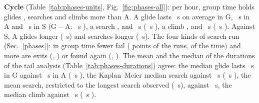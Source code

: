 \documentclass[10pt,a4paper]{article}
\newcommand{\G}{\mathrm{G}}
\newcommand{\A}{\mathrm{A}}
\newcommand{\Sl}{\mathrm{S}}
\newenvironment{step}{\begin{description}[leftmargin=0pt, itemsep=7pt, topsep=8pt]}{\end{description}}
\begin{document}
\begin{step}
  \textbf{Cycle} (Table~\ref{tab:phases-units}, Fig.~\ref{fig:phases-all}): per hour, group time holds
  \PhGlidePerHourGAAll{} glides \PhGlidePerHourGAAllBand, \PhSearchPerHourGAAll{} searches
  \PhSearchPerHourGAAllBand{} and \PhCphGAAll{} climbs more than $\A$. A glide lasts \PhGlideMeanGAll~s on average in $\G$,
  \PhGlideMeanAAll~s in $\A$ and \PhGlideMeanSAll~s in $\Sl$ ($\G-\A$: \PhGlideMeanGAAll~s \PhGlideMeanGAAllBand), a search
  \PhSearchMeanGAll, \PhSearchMeanAAll{} and \PhSearchMeanSAll~s (\PhSearchMeanGAAll~s \PhSearchMeanGAAllBand), a climb
  \PhClimbMeanGAll, \PhClimbMeanAAll{} and \PhClimbMeanSAll~s (\PhClimbMeanGAAll~s \PhClimbMeanGAAllBand). Against $\Sl$,
  $\A$ glides longer (\PhGlideMeanASAll~s) and searches longer (\PhSearchMeanASAll~s). The four kinds of search run
  (Sec.~\ref{phases}): in group time fewer fail (\PhKindFailedRunsGAAll{} points of the runs, \PhKindFailedTimeGAAll{} of the
  time) and more are exits (\PhKindExitRunsGAAll{}, \PhKindExitTimeGAAll) or found again (\PhKindRefoundRunsGAAll{},
  \PhKindRefoundTimeGAAll).
  The mean and the median of the durations of the tail analysis (Table~\ref{tab:phases-durations}) agree: the median
  glide lasts \PhDurMedianGlideGAll~s in $\G$ against \PhDurMedianGlideAAll~s in $\A$ (\PhDurMedianGlideGAAll~s
  \PhDurMedianGlideGAAllBand), the Kaplan--Meier median search \PhDurMedianSearchGAll{} against
  \PhDurMedianSearchAAll~s (\PhDurMedianSearchGAAll~s \PhDurMedianSearchGAAllBand), the mean search, restricted to the longest
  search observed (\PhDurLimitAll~s), \PhDurMeanSearchGAll{} against \PhDurMeanSearchAAll~s, the median climb
  \PhDurMedianClimbGAll{} against \PhDurMedianClimbAAll~s (\PhDurMedianClimbGAAll~s \PhDurMedianClimbGAAllBand).


\end{step}
\end{document}
